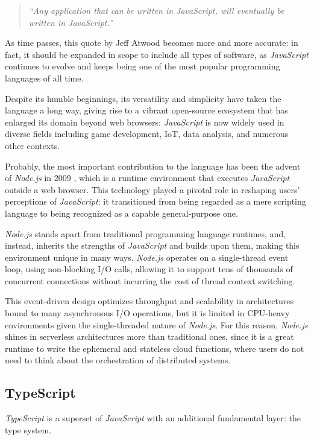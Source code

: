 \begin{quote}
  \textit{``Any application that can be written in JavaScript, will eventually be written in JavaScript.''}
\end{quote}

As time passes, this quote by Jeff Atwood becomes more and more accurate:
in fact, it should be expanded in scope to include all types of software,
as \textit{JavaScript} continues to evolve and keeps being one of the most
popular programming languages of all time.

Despite its humble beginnings, its versatility and simplicity
have taken the language a long way, giving rise to a vibrant open-source ecosystem
that has enlarged its domain beyond web browsers:
\textit{JavaScript} is now widely used in diverse fields including
game development, IoT, data analysis, and numerous other contexts.

Probably, the most important contribution to the language has been
the advent of \textit{Node.js} in 2009 \cite{node}, which is a runtime environment
that executes \textit{JavaScript} outside a web browser.
This technology played a pivotal role in reshaping users' perceptions of \textit{JavaScript}:
it transitioned from being regarded as a mere scripting language
to being recognized as a capable general-purpose one.

\textit{Node.js} stands apart from traditional programming language runtimes,
and, instead, inherits the strengths of \textit{JavaScript} and builds upon them,
making this environment unique in many ways.
\textit{Node.js} operates on a single-thread event loop,
using non-blocking I/O calls, allowing it to support tens of thousands
of concurrent connections without incurring the cost of thread context switching.

This event-driven design optimizes throughput and scalability in architectures
bound to many asynchronous I/O operations, but it is limited in CPU-heavy environments
given the single-threaded nature of \textit{Node.js}.
For this reason, \textit{Node.js} shines in serverless architectures more than
traditional ones, since it is a great runtime to write the ephemeral and stateless
cloud functions, where users do not need to think about the orchestration of distributed systems.

\subsection{TypeScript}

\textit{TypeScript} is a superset of \textit{JavaScript} with an additional fundamental layer: the type system.

